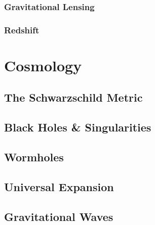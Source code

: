 \documentclass{article}
\begin{document}
 	\subsubsection{Gravitational Lensing}
 	\subsubsection{Redshift}
 	\section{Cosmology}
 	\subsection{The Schwarzschild Metric}
 	\subsection{Black Holes \& Singularities}
 	\subsection{Wormholes}
 	\subsection{Universal Expansion}
 	\subsection{Gravitational Waves}
 	
\end{document}
